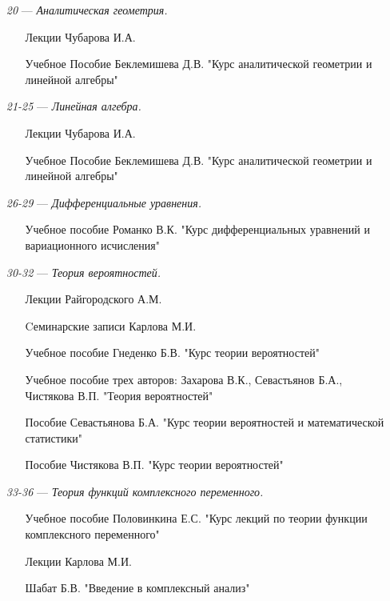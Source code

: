 \begin{itemize}
\item[\textit{20}] 
\; --- \: \textit{Аналитическая геометрия.}
\begin{itemize}
\item[\textbullet]
Лекции Чубарова И.А. 
\item[\textbullet]
Учебное Пособие Беклемишева Д.В. "Курс аналитической геометрии и линейной алгебры"
\end{itemize}
\item[\textit{21-25}] 
\; --- \: \textit{Линейная алгебра.}
\begin{itemize}
\item[\textbullet]
Лекции Чубарова И.А. 
\item[\textbullet]
Учебное Пособие Беклемишева Д.В. "Курс аналитической геометрии и линейной алгебры"
\end{itemize}
\item[\textit{26-29}] 
\; --- \: \textit{Дифференциальные уравнения.}
\begin{itemize}
\item[\textbullet] 
Учебное пособие Романко В.К. "Курс дифференциальных уравнений и вариационного исчисления"
\end{itemize}
\item[\textit{30-32}]
\; --- \: \textit{Теория вероятностей.}
\begin{itemize}
\item[\textbullet]
Лекции Райгородского А.М.
\item[\textbullet]
Cеминарские записи Карлова М.И.
\item[\textbullet]
Учебное пособие Гнеденко Б.В. "Курс теории вероятностей"
\item [\textbullet]
Учебное пособие трех авторов: Захарова В.К., Севастьянов Б.А., Чистякова В.П. "Теория вероятностей"
\item[\textbullet]
Пособие Севастьянова Б.А. "Курс теории вероятностей и математической статистики"
\item[\textbullet]
Пособие Чистякова В.П. "Курс теории вероятностей"
\end{itemize}

\item[\textit{33-36}]
\; --- \: \textit{Теория функций комплексного переменного.}
\begin{itemize}
\item[\textbullet]
Учебное пособие Половинкина Е.С. "Курс лекций по теории функции комплексного переменного"
\item[\textbullet] 
Лекции Карлова М.И. 
\item[\textbullet] 
Шабат Б.В. "Введение в комплексный анализ"
\end{itemize}
\end{itemize}
